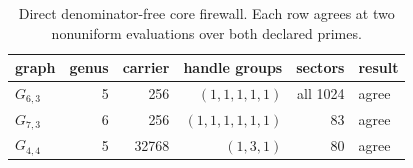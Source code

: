 \begin{table}[ht]
\centering
\caption{Direct denominator-free core firewall.  Each row agrees at
two nonuniform evaluations over both declared primes.}
\label{tab:polynomial-core-firewall}
\small
\begin{tabular}{@{}lrrrrl@{}}
\toprule
graph & genus & carrier & handle groups & sectors & result\\
\midrule
$G_{6,3}$ & 5 & 256 & $(1,1,1,1,1)$ & all 1024 & agree\\
$G_{7,3}$ & 6 & 256 & $(1,1,1,1,1,1)$ & 83 & agree\\
$G_{4,4}$ & 5 & 32768 & $(1,3,1)$ & 80 & agree\\
\bottomrule
\end{tabular}
\end{table}
